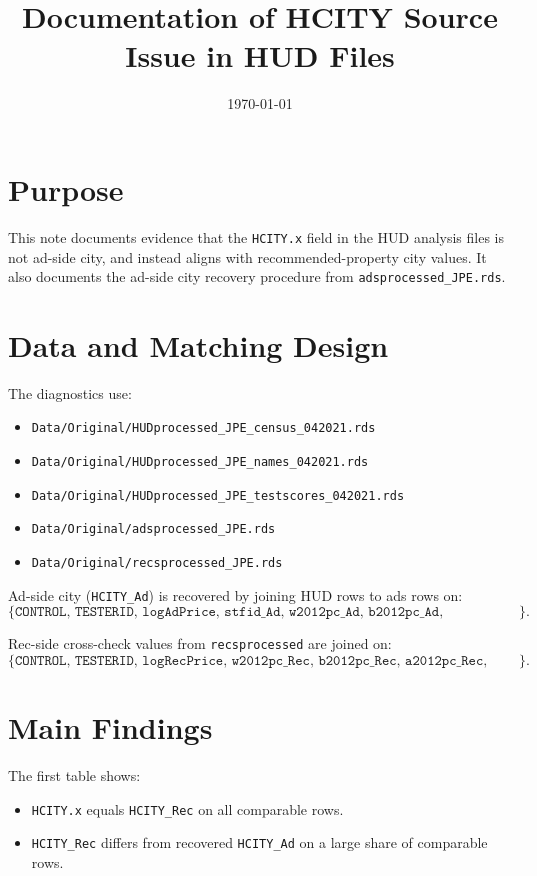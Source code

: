 \documentclass[11pt]{article}
\title{Documentation of HCITY Source Issue in HUD Files}
\author{}
\date{\today}
\begin{document}
\maketitle
\onehalfspacing

\section{Purpose}
This note documents evidence that the \texttt{HCITY.x} field in the HUD analysis files is not ad-side city, and instead aligns with recommended-property city values. It also documents the ad-side city recovery procedure from \texttt{adsprocessed\_JPE.rds}.

\section{Data and Matching Design}
The diagnostics use:
\begin{itemize}
\item \texttt{Data/Original/HUDprocessed\_JPE\_census\_042021.rds}
\item \texttt{Data/Original/HUDprocessed\_JPE\_names\_042021.rds}
\item \texttt{Data/Original/HUDprocessed\_JPE\_testscores\_042021.rds}
\item \texttt{Data/Original/adsprocessed\_JPE.rds}
\item \texttt{Data/Original/recsprocessed\_JPE.rds}
\end{itemize}

Ad-side city (\texttt{HCITY\_Ad}) is recovered by joining HUD rows to ads rows on:
\[
\{\texttt{CONTROL, TESTERID, logAdPrice, stfid\_Ad, w2012pc\_Ad, b2012pc\_Ad, a2012pc\_Ad, hisp2012pc\_Ad, oth2012pc\_Ad}\}.
\]

Rec-side cross-check values from \texttt{recsprocessed} are joined on:
\[
\{\texttt{CONTROL, TESTERID, logRecPrice, w2012pc\_Rec, b2012pc\_Rec, a2012pc\_Rec, hisp2012pc\_Rec, oth2012pc\_Rec}\}.
\]

\section{Main Findings}


The first table shows:
\begin{itemize}
\item \texttt{HCITY.x} equals \texttt{HCITY\_Rec} on all comparable rows.
\item \texttt{HCITY\_Rec} differs from recovered \texttt{HCITY\_Ad} on a large share of comparable rows.
\end{itemize}
\end{document}
